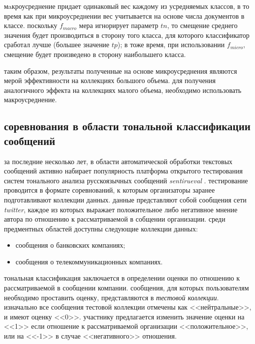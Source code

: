 
    мaкроусреднение придает одинаковый вес каждому из усредняемых классов, в то
    время как при микроусреднении вес учитывается на основе числа документов в
    классе. поскольку $f_{macro}$ мера игнорирует параметр $tn$, то смещение
    среднего значения будет производиться в сторону того класса, для которого классификатор сработал
    лучше (большее значение $tp$); в тоже время, при использовании $f_{micro}$,
    смещение будет произведено в сторону наибольшего класса. \cite{micromacromeasures}

    таким образом, результаты полученные на основе микроусреднения являются мерой
    эффективности на коллекциях большого объема. для получения аналогичного эффекта
    на коллекциях малого объема, необходимо использовать макроусреднение. \cite{micromacromeasuresdifferences}

    \subsection{соревнования в области тональной классификации сообщений}
    за последние несколько лет, в области автоматической обработки текстовых сообщений
    активно набирает популярность платформа открытого тестирования систем
    тонального анализа русскоязычных сообщений {\it sentirueval} \cite{tonalityanalisys}.
    тестирование проводится в формате соревнований, к которым организаторы заранее подготавливают
    коллекции данных. данные представляют собой сообщения сети {\it twitter}, каждое из которых
    выражает положительное либо негативное мнение автора по отношению к рассматриваемой
    в собщении организации. среди предментных областей доступны следующие коллекции
    данных:
    \begin{itemize}
        \item сообщения о банковских компаниях;
        \item сообщения о телекоммуникационных компаниях.
    \end{itemize}

    тональная классификация заключается в определении оценки по отношению к
    рассматриваемой в сообщении компании. сообщения, для которых пользователям
    необходимо проставить оценку, представляются в {\it тестовой коллекции}. изначально все
    сообщения тестовой коллекции отмечены как <<нейтральные>>, и имеют оценку <<0>>.
    участнику предлагается изменить значение оценки на <<1>> если отношение к
    рассматриваемой организации <<положительное>>, или на <<-1>> в случае
    <<негативного>> отношения.

